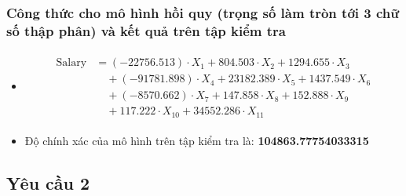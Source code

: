 \documentclass{report}
\begin{document}
        \subsubsection{Công thức cho mô hình hồi quy (trọng số làm tròn tới 3 chữ số thập phân) và kết quả trên tập kiểm tra}
            \begin{itemize}
                \item     
                    \begin{align}
                        \begin{split}
                            \text{Salary} &= (-22756.513) \cdot X_1 + 804.503 \cdot X_2 + 1294.655 \cdot X_3 \\
                            &\quad + (-91781.898) \cdot X_4 + 23182.389 \cdot X_5 + 1437.549 \cdot X_6 \\
                            &\quad + (-8570.662) \cdot X_7 + 147.858 \cdot X_8 + 152.888 \cdot X_9 \\
                            &\quad + 117.222 \cdot X_{10} + 34552.286 \cdot X_{11}
                        \end{split}
                    \end{align}
                \item Độ chính xác của mô hình trên tập kiểm tra là: \textbf{104863.77754033315}
            \end{itemize}

    \subsection{Yêu cầu 2}
\end{document}
